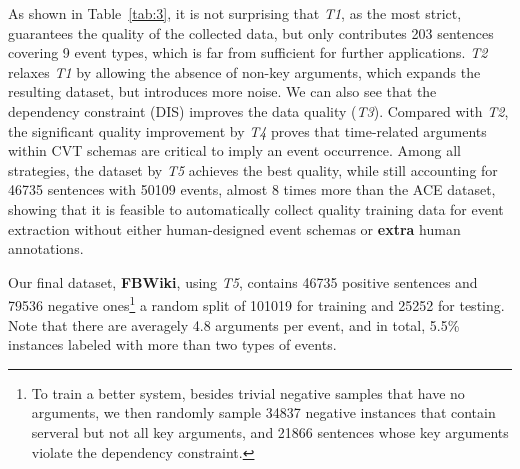 As shown in Table~\ref{tab:3}, it is not surprising that \emph{T1}, as the most strict, guarantees the quality of the collected data, but only contributes 203 sentences covering 9 event types, which is far from sufficient for further applications. \emph{T2} relaxes \emph{T1} by allowing the absence of non-key arguments, which expands the resulting dataset, but introduces more noise. 
We can also see that the dependency constraint (DIS) improves the data quality (\emph{T3}).
Compared with \emph{T2}, the significant quality improvement by \emph{T4} proves that time-related arguments within CVT schemas are critical to imply an event occurrence. Among all strategies, the dataset by \emph{T5} achieves the best quality, while still accounting for 46735 sentences with 50109 events, almost 8 times more than the ACE dataset, showing that it is feasible to automatically collect quality training data for event extraction without either human-designed event schemas or \textbf{extra} human annotations.     


Our final dataset, \textbf{FBWiki}, using \emph{T5}, contains 46735 positive sentences and 79536 negative 
ones\footnote{To train a better system, besides trivial negative samples that have no arguments, we then randomly sample 34837 negative instances that contain serveral but not all key arguments, and 21866 sentences whose key arguments violate the dependency constraint.}
 a random split of 101019 for 
training and 25252 for testing. Note that there are averagely 4.8 arguments per event, and in total, 5.5\% instances labeled with more than two types of events. 

